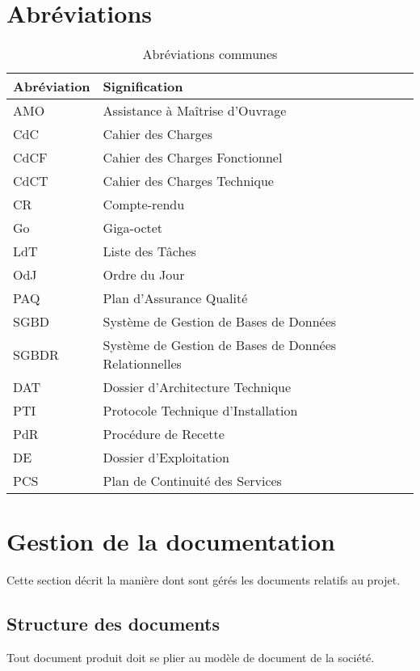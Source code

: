 \documentclass[11pt,fleqn]{report}
\begin{document}
\chapter{Abréviations}
\begin{table}[htbp]
	\centering
	\begin{tabularx}{\linewidth}{m{30mm} X}
		\toprule
		\textbf{Abréviation} & \textbf{Signification} \\
		\midrule
		AMO & Assistance à Maîtrise d'Ouvrage \\
		CdC & Cahier des Charges \\
		CdCF & Cahier des Charges Fonctionnel \\
		CdCT & Cahier des Charges Technique \\
		CR & Compte-rendu \\
		Go & Giga-octet \\
		LdT & Liste des Tâches \\
		OdJ & Ordre du Jour \\
		PAQ & Plan d'Assurance Qualité \\
		SGBD & Système de Gestion de Bases de Données \\
		SGBDR & Système de Gestion de Bases de Données Relationnelles \\
		DAT & Dossier d'Architecture Technique \\
		PTI & Protocole Technique d'Installation \\
		PdR & Procédure de Recette \\
		DE & Dossier d'Exploitation \\
		PCS & Plan de Continuité des Services \\
		\bottomrule
	\end{tabularx}
	\caption{Abréviations communes}
	\label{AbreviationsCommunes}
\end{table}

\chapter{Gestion de la documentation}
Cette section décrit la manière dont sont gérés les documents relatifs au projet.

\section{Structure des documents}
Tout document produit doit se plier au modèle de document de la société.
\end{document}
